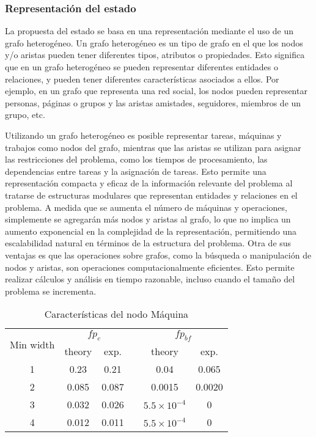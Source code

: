 \subsubsection{Representación del estado}
La propuesta del estado se basa en una representación mediante el uso de un grafo heterogéneo. Un grafo 
heterogéneo es un tipo de grafo en el que los nodos y/o aristas pueden tener diferentes tipos, atributos 
o propiedades. Esto significa que en un grafo heterogéneo se pueden representar diferentes entidades 
o relaciones, y pueden tener diferentes características asociados a ellos. Por ejemplo, en un grafo 
que representa una red social, los nodos pueden representar personas, páginas o grupos y 
las aristas amistades, seguidores, miembros de un grupo, etc.\medskip 

Utilizando un grafo heterogéneo es posible representar tareas, máquinas y trabajos como nodos del grafo, 
mientras que las aristas se utilizan para asignar las restricciones del problema, como los tiempos de 
procesamiento, las dependencias entre tareas y la asignación de tareas. Esto permite una representación 
compacta y eficaz de la información relevante del problema al tratarse de estructuras modulares que 
representan entidades y relaciones en el problema. A medida que se aumenta el número de máquinas y 
operaciones, simplemente se agregarán más nodos y aristas al grafo, lo que no implica un aumento exponencial 
en la complejidad de la representación, permitiendo una escalabilidad natural en términos de la estructura 
del problema. Otra de sus ventajas es que las operaciones sobre grafos, como la búsqueda o manipulación de 
nodos y aristas, son operaciones computacionalmente eficientes. Esto permite realizar cálculos y 
análisis en tiempo razonable, incluso cuando el tamaño del problema se incrementa. 

\begin{table}[ht]
    \caption{Características del nodo Máquina} 
    \centering 
    
    \begin{tabular}{cccccc} %
    \toprule

    \multirow{2}{*}{
    \parbox[c]{.2\linewidth}{\centering Min width}}
      & \multicolumn{2}{c}{$fp_{c}$} &&
    \multicolumn{2}{c}{$fp_{bf}$} \\ 
    \cmidrule{2-3} \cmidrule{5-6}
    
     & {\centering theory} & {exp.} && {theory} & {exp.}  \\
    \midrule
    1 & 0.23  & 0.21  && 0.04               & 0.065 \\
    2 & 0.085 & 0.087 && 0.0015             & 0.0020 \\
    3 & 0.032 & 0.026 && $5.5\times10^{-4}$ & 0 \\
    4 & 0.012 & 0.011 && $5.5\times10^{-4}$ & 0 \\
    \bottomrule
    
    \end{tabular}
\end{table}


